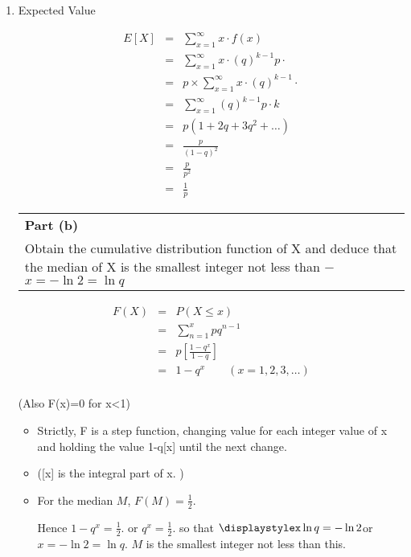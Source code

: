 \documentclass[a4paper,12pt]{article}
\begin{document}
\begin{enumerate}
    \item Expected Value


\begin{eqnarray*}
E[X] &=&
\sum_{x=1}^{\infty } x \cdot f(x)   
\\&=&
\sum_{x=1}^{\infty } x \cdot(q)^{k-1}p\cdot   
\\&=&
p \times \sum_{x=1}^{\infty } x \cdot(q)^{k-1}\cdot   
\\&=&
\sum_{x=1}^{\infty }(q)^{k-1}p\cdot k \\&=& p(1 + 2q + 3q^2 + \ldots)
\\&=& \frac{p}{(1 -  q)^2} \\&=& \frac{p}{p^2} \\&=& \frac{1}{p} 
\end{eqnarray*}
 \begin{table}[ht!]
     \centering
     \begin{tabular}{|p{15cm}|}
     \hline        
 \noindent \textbf{Part (b)}\\
\noindent Obtain the cumulative distribution function of X and deduce that the median of X is the
smallest integer not less than − 
${\displaystyle x = -\ln 2 = \ln q }$

\\ \hline
 \end{tabular}
\end{table}

\begin{eqnarray*}
F(X) &=& P(X \leq x) \\
&=& \sum^{x}_{n=1} pq^{n-1} \\
&=& p \left[ \frac{1-q^x}{1-q} \right] \\
&=& 1-q^x \qquad(x=1,2,3,\ldots)\\
\end{eqnarray*}

(Also F(x)=0 for x<1)
\begin{itemize}
    \item Strictly, F is a step function, changing value for each integer value of x and holding the value
1-q[x] until the next change.
\item ([x] is the integral part of x. )
\item For the median $M$, ${\displaystyle F(M)=\frac{1}{2}  }$.

Hence ${\displaystyle 1-q^x=\frac{1}{2}  }$. or ${\displaystyle q^x=\frac{1}{2}  }$. 
so that ${\displaystylex \ln q = -\ln 2   }$or ${\displaystyle x = -\ln 2 = \ln q }$. 
$M$ is the smallest integer not
less than this.




\end{itemize}
\end{enumerate}
\end{document}
